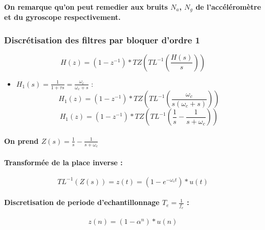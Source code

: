 \paragraph{On remarque qu'on peut remedier aux bruits $N_a$, $N_g$ de l'accéléromètre et du gyroscope respectivement.}

\subsubsection{Discrétisation des filtres par bloquer d'ordre 1}

\begin{equation}
	H(z) = (1 - z^{-1}) * TZ(TL^{-1}(\frac{H(s)}{s}))
\end{equation}

\begin{itemize}
	\item $H_1(s) = \frac{1}{1 + \tau s} = \frac{\omega_c}{\omega_c + s}$ : \begin{equation}
		H_1(z) = (1 - z^{-1}) * TZ(TL^{-1}(\frac{\omega_c}{s(\omega_c + s)}))
	\end{equation}
	\begin{equation}
		H_1(z) = (1 - z^{-1}) * TZ(TL^{-1}(\frac{1}{s} - \frac{1}{s + \omega_c}))
	\end{equation}
\end{itemize}

\paragraph{On prend $Z(s) = \frac{1}{s} - \frac{1}{s + \omega_c}$}

\paragraph{Transformée de la place inverse :}

\begin{equation}
	TL^{-1}(Z(s)) = z(t) = (1 - e^{-\omega_c t}) * u(t)
\end{equation}

\paragraph{Discretisation de periode d'echantillonnage $T_e = \frac{1}{f_e}$ :}

\begin{equation}
	z(n) = (1 - \alpha^{n}) * u(n)
\end{equation}


